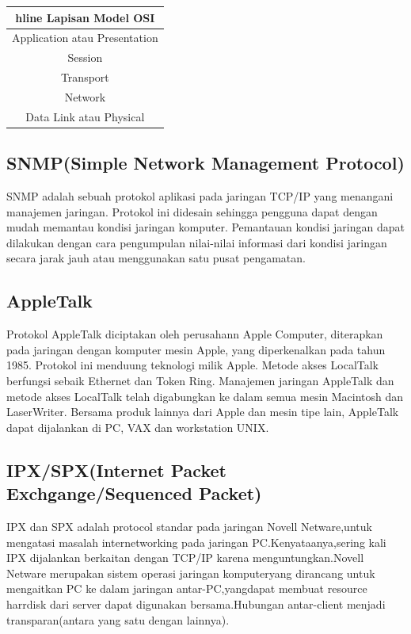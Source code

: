 \begin{table} [H]
\begin {tabular} {|c|}
hline
Lapisan Model OSI \\
\hline
Application atau Presentation & \\
Session & \\
Transport & \\
Network & \\
Data Link atau Physical & \\
\hline
\end{tabular}
\end{table} 
  
 \subsection{SNMP(Simple Network Management Protocol)}
SNMP adalah sebuah protokol aplikasi pada jaringan TCP/IP yang menangani manajemen jaringan. 
Protokol ini didesain sehingga pengguna dapat dengan mudah memantau kondisi jaringan komputer. 
Pemantauan kondisi jaringan dapat dilakukan dengan cara pengumpulan nilai-nilai informasi dari kondisi jaringan secara jarak jauh atau menggunakan satu pusat pengamatan.
  
 \subsection{AppleTalk} 
Protokol AppleTalk diciptakan oleh perusahann Apple Computer, diterapkan pada jaringan dengan komputer mesin Apple, yang diperkenalkan 
pada tahun 1985. Protokol ini menduung teknologi milik Apple. Metode akses LocalTalk berfungsi sebaik Ethernet dan Token Ring. Manajemen 
jaringan AppleTalk dan metode akses LocalTalk telah digabungkan ke dalam semua mesin Macintosh dan LaserWriter. Bersama produk lainnya 
dari Apple dan mesin tipe lain, AppleTalk dapat dijalankan di PC, VAX dan workstation UNIX.

\subsection{IPX/SPX(Internet Packet Exchgange/Sequenced Packet)}  
IPX dan SPX adalah protocol standar pada jaringan Novell Netware,untuk mengatasi masalah internetworking pada jaringan 
PC.Kenyataanya,sering kali IPX dijalankan berkaitan dengan TCP/IP karena menguntungkan.Novell Netware merupakan sistem operasi jaringan 
komputeryang dirancang untuk mengaitkan PC ke dalam jaringan antar-PC,yangdapat membuat resource harrdisk dari server dapat digunakan 
bersama.Hubungan antar-client menjadi transparan(antara yang satu dengan lainnya).

